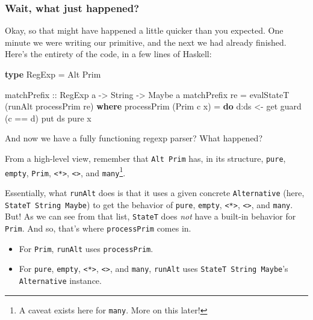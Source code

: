 \documentclass[]{article}
\newenvironment{Shaded}{}{}
\newcommand{\DataTypeTok}[1]{\textcolor[rgb]{0.56,0.13,0.00}{#1}}
\newcommand{\FunctionTok}[1]{\textcolor[rgb]{0.02,0.16,0.49}{#1}}
\newcommand{\KeywordTok}[1]{\textcolor[rgb]{0.00,0.44,0.13}{\textbf{#1}}}
\newcommand{\NormalTok}[1]{#1}
\newcommand{\OtherTok}[1]{\textcolor[rgb]{0.00,0.44,0.13}{#1}}
\begin{document}
\hypertarget{wait-what-just-happened}{%
\subsubsection{Wait, what just happened?}\label{wait-what-just-happened}}

Okay, so that might have happened a little quicker than you expected. One minute
we were writing our primitive, and the next we had already finished. Here's the
entirety of the code, in a few lines of Haskell:

\begin{Shaded}
\begin{Highlighting}[]
\KeywordTok{type} \DataTypeTok{RegExp} \FunctionTok{=} \DataTypeTok{Alt} \DataTypeTok{Prim}

\OtherTok{matchPrefix ::} \DataTypeTok{RegExp}\NormalTok{ a }\OtherTok{->} \DataTypeTok{String} \OtherTok{->} \DataTypeTok{Maybe}\NormalTok{ a}
\NormalTok{matchPrefix re }\FunctionTok{=}\NormalTok{ evalStateT (runAlt processPrim re)}
  \KeywordTok{where}
\NormalTok{    processPrim (}\DataTypeTok{Prim}\NormalTok{ c x) }\FunctionTok{=} \KeywordTok{do}
\NormalTok{      d}\FunctionTok{:}\NormalTok{ds }\OtherTok{<-}\NormalTok{ get}
\NormalTok{      guard (c }\FunctionTok{==}\NormalTok{ d)}
\NormalTok{      put ds}
      \FunctionTok{pure}\NormalTok{ x}
\end{Highlighting}
\end{Shaded}

And now we have a fully functioning regexp parser? What happened?

From a high-level view, remember that \texttt{Alt\ Prim} has, in its structure,
\texttt{pure}, \texttt{empty}, \texttt{Prim},
\texttt{\textless{}*\textgreater{}},
\texttt{\textless{}\textbar{}\textgreater{}}, and \texttt{many}\footnote{A
  caveat exists here for \texttt{many}. More on this later!}.

Essentially, what \texttt{runAlt} does is that it uses a given concrete
\texttt{Alternative} (here, \texttt{StateT\ String\ Maybe}) to get the behavior
of \texttt{pure}, \texttt{empty}, \texttt{\textless{}*\textgreater{}},
\texttt{\textless{}\textbar{}\textgreater{}}, and \texttt{many}. But! As we can
see from that list, \texttt{StateT} does \emph{not} have a built-in behavior for
\texttt{Prim}. And so, that's where \texttt{processPrim} comes in.

\begin{itemize}
\tightlist
\item
  For \texttt{Prim}, \texttt{runAlt} uses \texttt{processPrim}.
\item
  For \texttt{pure}, \texttt{empty}, \texttt{\textless{}*\textgreater{}},
  \texttt{\textless{}\textbar{}\textgreater{}}, and \texttt{many},
  \texttt{runAlt} uses \texttt{StateT\ String\ Maybe}'s \texttt{Alternative}
  instance.
\end{itemize}
\end{document}
